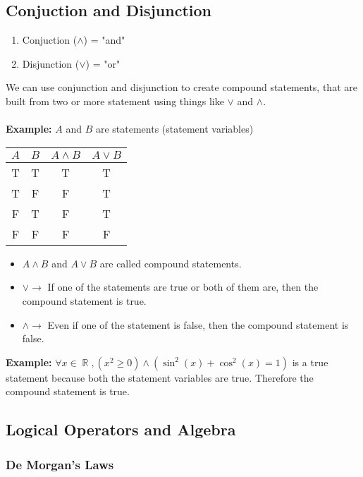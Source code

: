 \documentclass[10pt]{article}
\DeclareMathOperator{\R}{{\mathbb{R}}}
\theoremstyle{break}
\begin{document}
\subsection{Conjuction and Disjunction}
\begin{enumerate}
    \item Conjuction ($\wedge$) = "and"
    \item Disjunction ($\vee$) = "or"
\end{enumerate}
We can use conjunction and disjunction to create compound statements, that are built from two or more statement using
things like $\vee$ and $\wedge$. \\ \: \\
\textbf{Example:} $A$ and $B$ are statements (statement variables)

\begin{table}[ht]
    \centering
    \begin{tabular}{|c|c|c|c|}
        \hline
        $A$ & $B$ & $A \wedge B$ & $A \vee B$ \\
        \hline
        T & T & T & T \\
        \hline
        T & F & F & T \\
        \hline
        F & T & F & T \\
        \hline 
        F & F & F & F \\ 
        \hline
    \end{tabular}
    \end{table}

\begin{itemize}
    \item $A \wedge B$ and $A \vee B$ are called compound statements.
    \item $\vee \to $ If one of the statements are true or both of them are, then the compound statement is true.
    \item $\wedge \to $ Even if one of the statement is false, then the compound statement is false.
\end{itemize}
\textbf{Example:} $\forall x \in \R, (x^2 \ge 0) \wedge (\sin^2(x) + \cos^2(x) = 1)$ is a true statement because both the statement variables are true. Therefore the compound statement is true.

\subsection{Logical Operators and Algebra}
\subsubsection{De Morgan's Laws}
\end{document}

